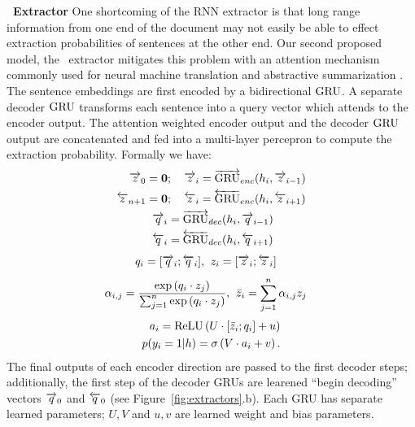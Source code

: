 {\textbf{\sts~Extractor} One shortcoming of the RNN extractor is that long range
information from one end of the document may not easily be able to effect 
extraction probabilities of sentences at the other end. 
Our second proposed model, the \sts~extractor mitigates this problem with an 
attention 
mechanism commonly
used for neural machine translation \cite{bahdanau2014neural} and 
abstractive summarization \cite{see2017get}. 
The sentence embeddings are first
encoded by a bidirectional $\operatorname{GRU}$. A separate decoder $\operatorname{GRU}$ transforms each 
sentence into a query vector which attends to the encoder output. The
attention weighted encoder output and the decoder $\operatorname{GRU}$ output are concatenated
and fed into a multi-layer percepron to compute the extraction probability.
Formally we have:
\begin{align}
    \rEncExtHidden_0 = \textbf{0}&;\quad \rEncExtHidden_i = \rgru_{enc}(\sentEmb[i], \rEncExtHidden_{i-1}) \\
    \lEncExtHidden_{\docSize + 1} = \textbf{0}&;\quad  \lEncExtHidden_i = \lgru_{enc}(\sentEmb[i], \lEncExtHidden_{i+1}) \\
    \rDecExtHidden_i &= \rgru_{dec}(\sentEmb[i], \rDecExtHidden_{i-1}) \\
    \lDecExtHidden_i &= \lgru_{dec}(\sentEmb[i], \lDecExtHidden_{i+1}) 
\end{align}
\begin{align}
 q_i = [\overrightarrow{q}_i; \overleftarrow{q}_i], &\;\;
 z_i = [\overrightarrow{z}_i; \overleftarrow{z}_i] 
\end{align}
\begin{align}
 \alpha_{i,j} = 
   \frac{\exp \left(q_i \cdot z_j \right)}{
   \sum_{j=1}^{n}\exp\left(q_i \cdot z_j\right)}, 
& \;\; \bar{z}_i = \sum_{j=1}^{n} \alpha_{i,j} z_j 
\end{align}
\begin{align}
   \logits_i = \relu\left(U \cdot [\attnExtHidden_i; \decExtHidden_i] + u \right)&\\
   p(\slabel_i=1|\sentvec) = \sigma\left(V\cdot \logits_i + v  \right).
\end{align}
The final outputs of each encoder direction are passed to the first decoder
steps; additionally, the first step of the decoder GRUs are learened 
``begin decoding'' vectors $\overrightarrow{q}_0$ and $\overleftarrow{q}_0$ 
(see Figure~\ref{fig:extractors}.b).
Each GRU has separate learned 
parameters; $U, V$ and $u, v$ are learned weight and bias parameters.


}
